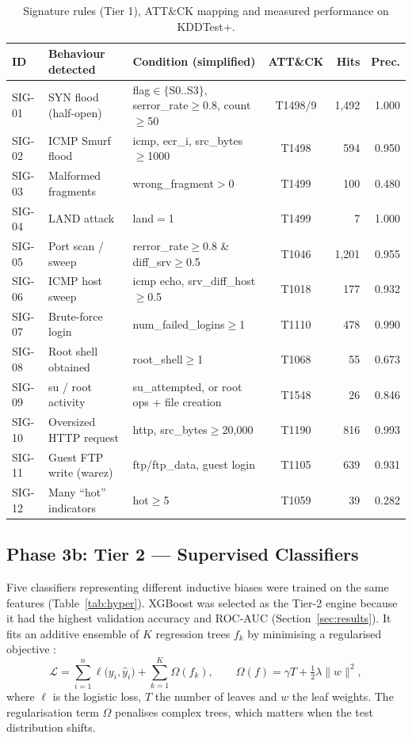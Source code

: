 \documentclass[12pt,a4paper,oneside]{article}
\begin{document}
\begin{table}[H]\centering\small
\caption{Signature rules (Tier 1), ATT\&CK mapping and measured performance on KDDTest+.}\label{tab:rules}
\begin{tabularx}{\linewidth}{l Y p{4.4cm} c r r}
\toprule
\textcolor{rblue}{ID} & \textcolor{rblue}{Behaviour detected} & \textcolor{rblue}{Condition (simplified)} & \textcolor{rblue}{ATT\&CK} & \textcolor{rblue}{Hits} & \textcolor{rblue}{Prec.} \\ \midrule
SIG-01 & SYN flood (half-open) & flag$\in\{$S0..S3$\}$, serror\_rate$\geq$0.8, count$\geq$50 & T1498/9 & 1{,}492 & 1.000 \\
SIG-02 & ICMP Smurf flood & icmp, ecr\_i, src\_bytes$\geq$1000 & T1498 & 594 & 0.950 \\
SIG-03 & Malformed fragments & wrong\_fragment$>$0 & T1499 & 100 & 0.480 \\
SIG-04 & LAND attack & land$=$1 & T1499 & 7 & 1.000 \\
SIG-05 & Port scan / sweep & rerror\_rate$\geq$0.8 \& diff\_srv$\geq$0.5 & T1046 & 1{,}201 & 0.955 \\
SIG-06 & ICMP host sweep & icmp echo, srv\_diff\_host$\geq$0.5 & T1018 & 177 & 0.932 \\
SIG-07 & Brute-force login & num\_failed\_logins$\geq$1 & T1110 & 478 & 0.990 \\
SIG-08 & Root shell obtained & root\_shell$\geq$1 & T1068 & 55 & 0.673 \\
SIG-09 & su / root activity & su\_attempted, or root ops + file creation & T1548 & 26 & 0.846 \\
SIG-10 & Oversized HTTP request & http, src\_bytes$\geq$20{,}000 & T1190 & 816 & 0.993 \\
SIG-11 & Guest FTP write (warez) & ftp/ftp\_data, guest login & T1105 & 639 & 0.931 \\
SIG-12 & Many ``hot'' indicators & hot$\geq$5 & T1059 & 39 & 0.282 \\
\bottomrule
\end{tabularx}
\end{table}

\subsection{Phase 3b: Tier 2 --- Supervised Classifiers}
Five classifiers representing different inductive biases were trained on the same features (Table~\ref{tab:hyper}). XGBoost was selected as the Tier-2 engine because it had the highest validation accuracy and ROC-AUC (Section~\ref{sec:results}). It fits an additive ensemble of $K$ regression trees $f_k$ by minimising a regularised objective \cite{chen2016xgboost}:
\begin{equation}
\mathcal{L} = \sum_{i=1}^{n} \ell\big(y_i,\hat{y}_i\big) + \sum_{k=1}^{K}\Omega(f_k),\qquad \Omega(f)=\gamma T+\tfrac{1}{2}\lambda\lVert w\rVert^{2},
\end{equation}
where $\ell$ is the logistic loss, $T$ the number of leaves and $w$ the leaf weights. The regularisation term $\Omega$ penalises complex trees, which matters when the test distribution shifts.
\end{document}
